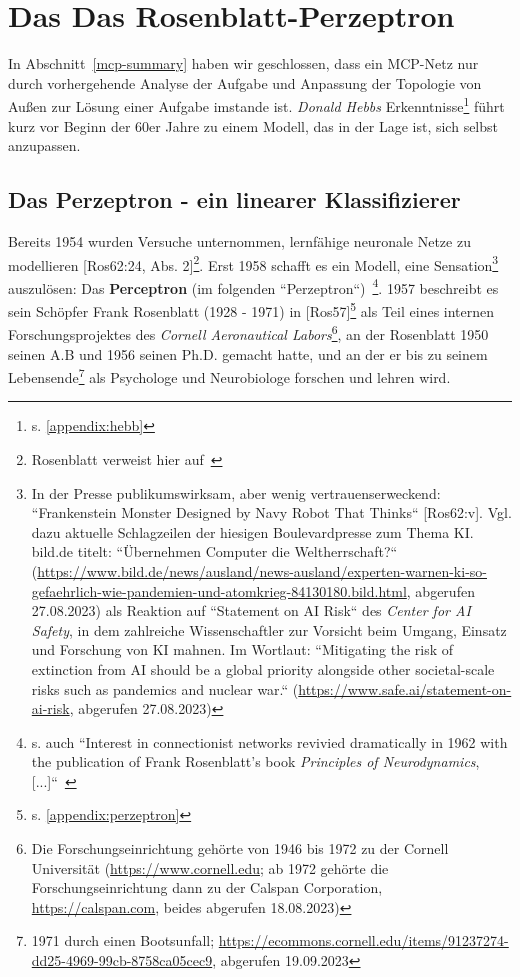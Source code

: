 \section{Das Das Rosenblatt-Perzeptron}

In Abschnitt~\ref{mcp-summary} haben wir geschlossen, dass ein MCP-Netz nur durch vorhergehende Analyse der Aufgabe und Anpassung der Topologie von Außen zur Lösung einer Aufgabe imstande ist.
\textit{Donald Hebbs} Erkenntnisse\footnote{
    s. \ref{appendix:hebb}
} führt kurz vor Beginn der 60er Jahre zu einem Modell, das in der Lage ist, sich selbst anzupassen.


\subsection{Das Perzeptron - ein linearer Klassifizierer}

Bereits 1954 wurden Versuche unternommen, lernfähige neuronale Netze zu modellieren [Ros62:24, Abs. 2]\footnote{
    Rosenblatt verweist hier auf~\cite{FC54}
}.
Erst 1958 schafft es ein Modell, eine Sensation\footnote{
    In der Presse publikumswirksam, aber wenig vertrauenserweckend: ``Frankenstein Monster Designed by Navy Robot That Thinks`` [Ros62:v]. Vgl. dazu aktuelle Schlagzeilen der hiesigen Boulevardpresse zum Thema KI. bild.de titelt: ``Übernehmen Computer die Weltherrschaft?`` (\url{https://www.bild.de/news/ausland/news-ausland/experten-warnen-ki-so-gefaehrlich-wie-pandemien-und-atomkrieg-84130180.bild.html}, abgerufen 27.08.2023) als Reaktion auf ``Statement on AI Risk`` des \textit{Center for AI Safety}, in dem zahlreiche Wissenschaftler zur Vorsicht beim Umgang, Einsatz und Forschung von KI mahnen. Im Wortlaut: ``Mitigating the risk of extinction from AI should be a global priority alongside other societal-scale risks such as pandemics and nuclear war.`` (\url{https://www.safe.ai/statement-on-ai-risk}, abgerufen 27.08.2023)
} auszulösen: Das \textbf{Perceptron} (im folgenden ``Perzeptron``)~\cite[89]{AR88}\footnote{
    s. auch ``Interest in connectionist networks revivied dramatically in 1962 with the publication of Frank Rosenblatt's book \textit{Principles of Neurodynamics}, [...]``~\cite[xi, Hervorhebung i.O.]{MP88}
}.
1957 beschreibt es sein Schöpfer Frank Rosenblatt (1928 - 1971) in [Ros57]\footnote{
    s. \ref{appendix:perzeptron}
} als Teil eines internen Forschungsprojektes des \textit{Cornell Aeronautical Labors}\footnote{
    Die Forschungseinrichtung gehörte von 1946 bis 1972 zu der Cornell Universität (\url{https://www.cornell.edu}; ab 1972 gehörte die Forschungseinrichtung dann zu der Calspan Corporation, \url{https://calspan.com}, beides abgerufen 18.08.2023)
}, an der Rosenblatt 1950 seinen A.B und 1956 seinen Ph.D. gemacht hatte, und an der er bis zu seinem Lebensende\footnote{
    1971 durch einen Bootsunfall; \url{https://ecommons.cornell.edu/items/91237274-dd25-4969-99cb-8758ca05cec9}, abgerufen 19.09.2023
} als Psychologe und Neurobiologe forschen und lehren wird.


